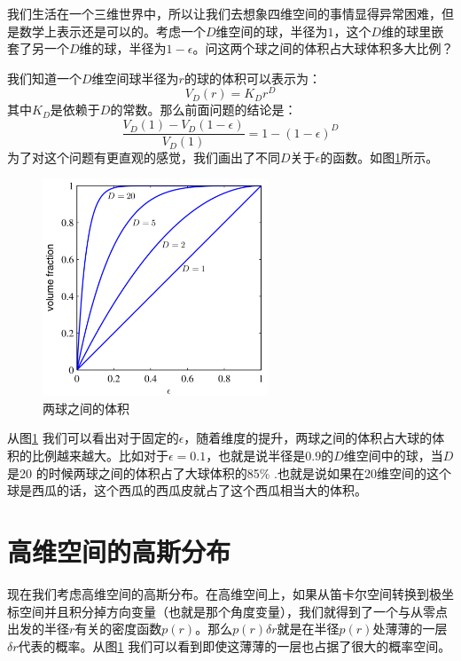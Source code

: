 \documentclass[10pt,a4paper,UTF8]{article}
\begin{document}
我们生活在一个三维世界中，所以让我们去想象四维空间的事情显得异常困难，但是数学上表示还是可以的。考虑一个\(D\)维空间的球，半径为\(1\)，这个\(D\)维的球里嵌套了另一个\(D\)维的球，半径为\(1-\epsilon\)。问这两个球之间的体积占大球体积多大比例？

我们知道一个\(D\)维空间球半径为\(r\)的球的体积可以表示为：
\begin{equation}
\label{eq:2}
V_{D}(r) = K_{D}r^{D}
\end{equation}
其中\(K_{D}\)是依赖于\(D\)的常数。那么前面问题的结论是：
\begin{equation}
\label{eq:3}
\frac{V_{D}(1) - V_{D}(1-\epsilon)}{V_{D}(1)} = 1- (1-\epsilon)^{D}
\end{equation}
为了对这个问题有更直观的感觉，我们画出了不同\(D\)关于\(\epsilon\)的函数。如图\ref{fig:orgd89db5a}所示。
\begin{figure}[htbp]
\centering
\includegraphics[width=0.6\textwidth]{../../img/computer_prml/20170503figure1dot22.png}
\caption{\label{fig:orgd89db5a}
两球之间的体积}
\end{figure}

从图\ref{fig:orgd89db5a} 我们可以看出对于固定的\(\epsilon\)，随着维度的提升，两球之间的体积占大球的体积的比例越来越大。比如对于\(\epsilon = 0.1\)，也就是说半径是\(0.9\)的\(D\)维空间中的球，当\(D\)是20 的时候两球之间的体积占了大球体积的85\% .也就是说如果在\(20\)维空间的这个球是西瓜的话，这个西瓜的西瓜皮就占了这个西瓜相当大的体积。

\section{高维空间的高斯分布}
\label{sec:org9483ee3}


现在我们考虑高维空间的高斯分布。在高维空间上，如果从笛卡尔空间转换到极坐标空间并且积分掉方向变量（也就是那个角度变量），我们就得到了一个与从零点出发的半径\(r\)有关的密度函数\(p(r)\)。那么\(p(r)\delta r\)就是在半径\(p(r)\)处薄薄的一层\(\delta r\)代表的概率。从图\ref{fig:orgd89db5a} 我们可以看到即使这薄薄的一层也占据了很大的概率空间。
\end{document}
